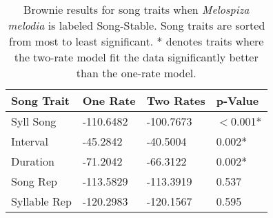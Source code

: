 \documentclass[a4paper,12pt]{article}
\begin{document}
\begin{table}[ht]
\caption{Brownie results for song traits when \textit{Melospiza melodia} is labeled Song-Stable. Song traits are sorted from most to least significant. * denotes traits where the two-rate model fit the data significantly better than the one-rate model.}
\centering
\begin{tabular}{llll}
  \hline
Song Trait & One Rate & Two Rates & p-Value \\ 
  \hline
Syll Song & -110.6482 & -100.7673 & $<$0.001* \\ 
  Interval & -45.2842 & -40.5004 & 0.002* \\ 
  Duration & -71.2042 & -66.3122 & 0.002* \\ 
  Song Rep & -113.5829 & -113.3919 & 0.537 \\ 
  Syllable Rep & -120.2983 & -120.1567 & 0.595 \\ 
   \hline
\end{tabular}
\end{table}
\end{document}
